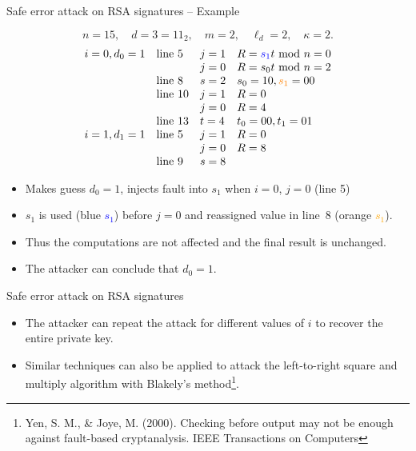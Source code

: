 \begin{frame}{Safe error attack on RSA signatures -- Example}
    \begin{example}
\[
n=15,\quad d=3=11_2,\quad m=2,\quad \ell_d=2,\quad \kappa=2.
\]
\[
\begin{array}{llll}
i=0,d_0=1 & \text{line 5}  & j=1 & R=\textcolor{blue}{s_1}t\textrm{~mod~} n=0\\
   &  & j=0 & R=s_0t\textrm{~mod~} n=2\\
   & \text{line 8}  & s=2 & s_0=10, \textcolor{orange}{s_1}=00\\
  &  \text{line 10} & j=1 & R=0\\
   & & j=0 & R=4\\
   &\text{line 13} & t=4 & t_{0}=00, t_{1}=01\\
i=1,d_1=1 & \text{line 5} & j=1 & R=0\\
& & j=0 & R=8\\
& \text{line 9} & s=8
\end{array}
\]
\begin{itemize}
\item Makes guess $d_0=1$, injects fault into $s_1$ when $i=0$, $j=0$ (line 5)
    \item $s_1$ is used (blue \textcolor{blue}{$s_1$}) before $j=0$ and reassigned value in line~8 (orange \textcolor{orange}{$s_1$}).
\item Thus the computations are not affected and the final result is unchanged.
\item The attacker can conclude that $d_0=1$.
\end{itemize}

\end{example}
\end{frame}

\begin{frame}{Safe error attack on RSA signatures}
    \begin{itemize}
\item The attacker can repeat the attack for different values of $i$ to recover the entire private key.
\item Similar techniques can also be applied to attack the left-to-right square and multiply algorithm with Blakely's method\footnote{Yen, S. M., \& Joye, M. (2000). Checking before output may not be enough against fault-based cryptanalysis. IEEE Transactions on Computers}.
    \end{itemize}
\end{frame}


